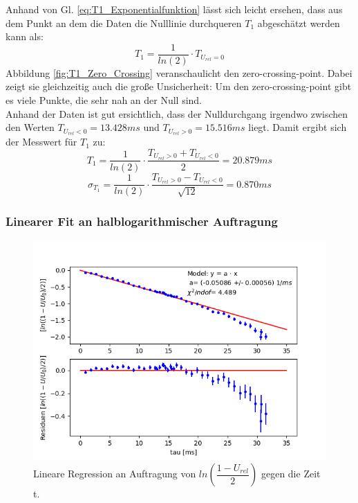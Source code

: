 \documentclass[12pt,a4paper]{article}
\begin{document}
Anhand von Gl. \ref{eq:T1_Exponentialfunktion} lässt sich leicht ersehen, dass aus dem Punkt an dem die Daten die Nulllinie durchqueren $T_1$ abgeschätzt werden kann als:
\begin{equation*}
T_1 = \dfrac{1}{ln(2)} \cdot T_{U_{rel} = 0}
\end{equation*}
Abbildung \ref{fig:T1_Zero_Crossing} veranschaulicht den zero-crossing-point. Dabei zeigt sie gleichzeitig auch die große Unsicherheit: Um den zero-crossing-point gibt es viele Punkte, die sehr nah an der Null sind. \\ 
Anhand der Daten ist gut ersichtlich, dass der Nulldurchgang irgendwo zwischen den Werten $T_{U_{rel} < 0} = 13.428ms$ und $T_{U_{rel} > 0} = 15.516ms$ liegt. Damit ergibt sich der Messwert für $T_1$ zu:
\begin{equation*}
T_1 = \dfrac{1}{ln(2)} \cdot \dfrac{T_{U_{rel} > 0} + T_{U_{rel} < 0}}{2} = 20.879 ms
\end{equation*}
\begin{equation*}
\sigma _{T_1} = \dfrac{1}{ln(2)} \cdot \dfrac{T_{U_{rel} > 0} - T_{U_{rel} < 0}}{\sqrt{12}} = 0.870 ms
\end{equation*}

\subsubsection{Linearer Fit an halblogarithmischer Auftragung}

\begin{figure}
\centering
\includegraphics[scale=0.7]{Bilder/T1_linFit_halblog.PNG}
\caption{Lineare Regression an Auftragung von $ln\left(\dfrac{1-U_{rel}}{2}\right)$ gegen die Zeit t.}
\label{fig:T1_linFit}
\end{figure}
\end{document}
